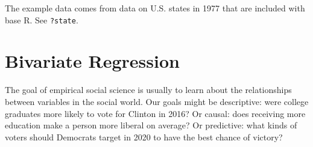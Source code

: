 \documentclass[12pt,oneside,openany]{book}
\newenvironment{Shaded}{\begin{snugshade}}{\end{snugshade}}
\newcommand{\KeywordTok}[1]{\textcolor[rgb]{0.13,0.29,0.53}{\textbf{{#1}}}}
\newcommand{\DataTypeTok}[1]{\textcolor[rgb]{0.13,0.29,0.53}{{#1}}}
\newcommand{\DecValTok}[1]{\textcolor[rgb]{0.00,0.00,0.81}{{#1}}}
\newcommand{\StringTok}[1]{\textcolor[rgb]{0.31,0.60,0.02}{{#1}}}
\newcommand{\OtherTok}[1]{\textcolor[rgb]{0.56,0.35,0.01}{{#1}}}
\newcommand{\NormalTok}[1]{{#1}}
\begin{document}
The example data comes from data on U.S. states in 1977 that are
included with base R. See \texttt{?state}.

\begin{Shaded}
\end{Shaded}

\chapter{Bivariate Regression}\label{bivariate}

\newcommand{\SSE}{\mathop{\rm SSE}\nolimits}
\newcommand{\RSS}{\mathop{\rm RSS}\nolimits}
\newcommand{\TSS}{\mathop{\rm TSS}\nolimits}
\newcommand{\Cov}{\mathop{\rm Cov}\nolimits}
\newcommand{\pderiv}[2]{\frac{\partial #1}{\partial #2}}

The goal of empirical social science is usually to learn about the
relationships between variables in the social world. Our goals might be
descriptive: were college graduates more likely to vote for Clinton in
2016? Or causal: does receiving more education make a person more
liberal on average? Or predictive: what kinds of voters should Democrats
target in 2020 to have the best chance of victory?
\end{document}
